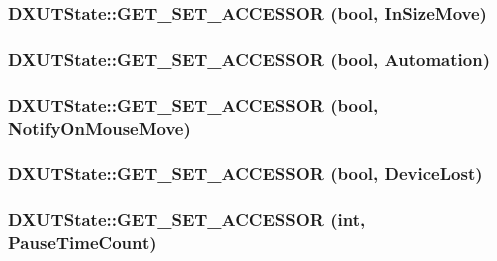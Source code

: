 \label{class_d_x_u_t_state_a6922427e890b6e63324c96a19df3858e}
\hypertarget{class_d_x_u_t_state_a4f607198bc37270086456d147197c6a1}{
\subsubsection[{GET\_\-SET\_\-ACCESSOR}]{\setlength{\rightskip}{0pt plus 5cm}DXUTState::GET\_\-SET\_\-ACCESSOR (bool, \/  InSizeMove)}}
\label{class_d_x_u_t_state_a4f607198bc37270086456d147197c6a1}
\hypertarget{class_d_x_u_t_state_a723ae3207d893c922cd9c6d2ff029f60}{
\subsubsection[{GET\_\-SET\_\-ACCESSOR}]{\setlength{\rightskip}{0pt plus 5cm}DXUTState::GET\_\-SET\_\-ACCESSOR (bool, \/  Automation)}}
\label{class_d_x_u_t_state_a723ae3207d893c922cd9c6d2ff029f60}
\hypertarget{class_d_x_u_t_state_a630e216973e43a6ca8a58fb920ff57e5}{
\subsubsection[{GET\_\-SET\_\-ACCESSOR}]{\setlength{\rightskip}{0pt plus 5cm}DXUTState::GET\_\-SET\_\-ACCESSOR (bool, \/  NotifyOnMouseMove)}}
\label{class_d_x_u_t_state_a630e216973e43a6ca8a58fb920ff57e5}
\hypertarget{class_d_x_u_t_state_a8157a0e71d8bf110321f863669395df0}{
\subsubsection[{GET\_\-SET\_\-ACCESSOR}]{\setlength{\rightskip}{0pt plus 5cm}DXUTState::GET\_\-SET\_\-ACCESSOR (bool, \/  DeviceLost)}}
\label{class_d_x_u_t_state_a8157a0e71d8bf110321f863669395df0}
\hypertarget{class_d_x_u_t_state_a13cadfb38e001bbb14292eb6aae1a03c}{
\subsubsection[{GET\_\-SET\_\-ACCESSOR}]{\setlength{\rightskip}{0pt plus 5cm}DXUTState::GET\_\-SET\_\-ACCESSOR ({\bf int}, \/  PauseTimeCount)}}
